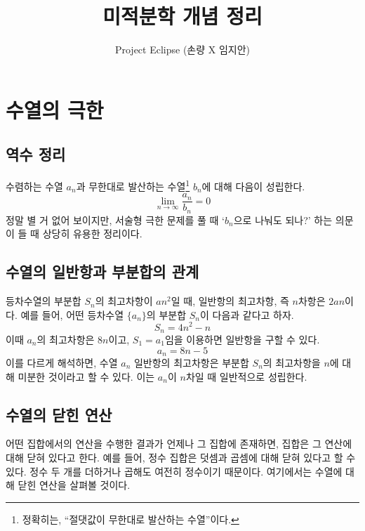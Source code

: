 \documentclass{scrartcl}
\title{미적분학 개념 정리}
\author{Project Eclipse (손량 X 임지안)}
\date{}
\begin{document}
\maketitle

\section{수열의 극한}
\subsection{역수 정리}
수렴하는 수열 \(a_n\)과 무한대로 발산하는 수열\footnote{정확히는, ``절댓값이 무한대로 발산하는 수열''이다.} \(b_n\)에 대해 다음이 성립한다.
\[\lim_{n \to \infty} {\frac{a_n}{b_n}}=0\]
정말 별 거 없어 보이지만, 서술형 극한 문제를 풀 때 `\(b_n\)으로 나눠도 되나?' 하는 의문이 들 때 상당히 유용한 정리이다.

\subsection{수열의 일반항과 부분합의 관계}
등차수열의 부분합 \(S_n\)의 최고차항이 \(an^2\)일 때, 일반항의 최고차항, 즉 \(n\)차항은 \(2an\)이다. 예를 들어, 어떤 등차수열 \(\{a_n\}\)의 부분합 \(S_n\)이 다음과 같다고 하자.
\[
S_n = 4n^2 - n
\]
이때 \(a_n\)의 최고차항은 \(8n\)이고, \(S_1 = a_1\)임을 이용하면 일반항을 구할 수 있다.
\[
a_n = 8n - 5
\]
이를 다르게 해석하면, 수열 \(a_n\) 일반항의 최고차항은 부분합 \(S_n\)의 최고차항을 \(n\)에 대해 미분한 것이라고 할 수 있다. 이는 \(a_n\)이 \(n\)차일 때 일반적으로 성립한다.

\subsection{수열의 닫힌 연산}
어떤 집합에서의 연산을 수행한 결과가 언제나 그 집합에 존재하면, 집합은 그 연산에 대해 닫혀 있다고 한다. 예를 들어, 정수 집합은 덧셈과 곱셈에 대해 닫혀 있다고 할 수 있다. 정수 두 개를 더하거나 곱해도 여전히 정수이기 때문이다. 여기에서는 수열에 대해 닫힌 연산을 살펴볼 것이다.
\end{document}
